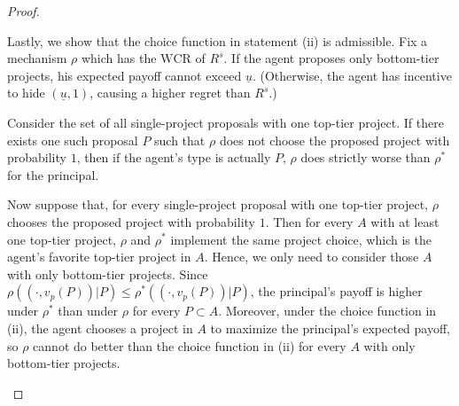 \documentclass[12pt,english]{article}
\newcommand{\under}{\underline}
\newcommand{\underu}{{\underline{u}}}
\theoremstyle{remark}
\theoremstyle{plain}
\theoremstyle{definition}
\newcommand{\wcr}{\mathrm{WCR}}
\begin{document}
\begin{proof}
\begin{enumerate}[(i)]
Lastly, we show that the choice function in statement (ii) is admissible. Fix a mechanism $\rho$ which has the $\wcr$ of $R^s$. If the agent proposes only bottom-tier projects, his expected payoff cannot exceed $\under u$. (Otherwise, the agent has incentive to hide $(\underu,1)$, causing a higher regret than $R^s$.)

Consider the set of all single-project proposals with one top-tier project. If there exists one such proposal $P$ such that $\rho$ does not choose the proposed project with probability $1$, then if the agent's type is actually $P$, $\rho$ does strictly worse than $\rho^*$ for the principal. 

Now suppose that, for every single-project proposal with one top-tier project, $\rho$ chooses the proposed project with probability $1$. Then for every $A$ with at least one top-tier project, $\rho$ and $\rho^\ast$ implement the same project choice, which is the agent's favorite top-tier project in $A$. Hence, we only need to consider those $A$ with only bottom-tier projects. Since $\rho((\cdot,v_p(P))|P) \leqslant \rho^\ast((\cdot,v_p(P))|P)$, the principal's payoff is higher under $\rho^\ast$ than under $\rho$ for every $P \subset A$. Moreover, under the choice function in (ii), the agent chooses a project in $A$ to maximize the principal's expected payoff, so $\rho$ cannot do better than the choice function in (ii) for every $A$ with only bottom-tier projects.  
   \end{enumerate}
	
\end{proof}




     \nocite{*}


\end{document}
